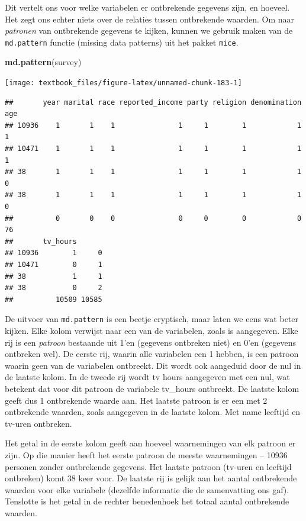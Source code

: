 \documentclass[]{tufte-book}
\newenvironment{Shaded}{}{}
\newcommand{\KeywordTok}[1]{\textcolor[rgb]{0.00,0.44,0.13}{\textbf{#1}}}
\newcommand{\NormalTok}[1]{#1}
\begin{document}
Dit vertelt ons voor welke variabelen er ontbrekende gegevens zijn, en hoeveel. Het zegt ons echter niets over de relaties tussen ontbrekende waarden. Om naar \emph{patronen} van ontbrekende gegevens te kijken, kunnen we gebruik maken van de \texttt{md.pattern} functie (missing data patterns) uit het pakket \texttt{mice}.

\begin{Shaded}
\begin{Highlighting}[]
\KeywordTok{md.pattern}\NormalTok{(survey)}
\end{Highlighting}
\end{Shaded}

\texttt{[image: textbook\_files/figure-latex/unnamed-chunk-183-1]}

\begin{verbatim}
##       year marital race reported_income party religion denomination age
## 10936    1       1    1               1     1        1            1   1
## 10471    1       1    1               1     1        1            1   1
## 38       1       1    1               1     1        1            1   0
## 38       1       1    1               1     1        1            1   0
##          0       0    0               0     0        0            0  76
##       tv_hours      
## 10936        1     0
## 10471        0     1
## 38           1     1
## 38           0     2
##          10509 10585
\end{verbatim}

De uitvoer van \texttt{md.pattern} is een beetje cryptisch, maar laten we eens wat beter kijken. Elke kolom verwijst naar een van de variabelen, zoals is aangegeven. Elke rij is een \emph{patroon} bestaande uit 1'en (gegevens ontbreken niet) en 0'en (gegevens ontbreken wel). De eerste rij, waarin alle variabelen een 1 hebben, is een patroon waarin geen van de variabelen ontbreekt. Dit wordt ook aangeduid door de nul in de laatste kolom. In de tweede rij wordt tv hours aangegeven met een nul, wat betekent dat voor dit patroon de variabele tv\_hours ontbreekt. De laatste kolom geeft dus 1 ontbrekende waarde aan. Het laatste patroon is er een met 2 ontbrekende waarden, zoals aangegeven in de laatste kolom. Met name leeftijd en tv-uren ontbreken.

Het getal in de eerste kolom geeft aan hoeveel waarnemingen van elk patroon er zijn. Op die manier heeft het eerste patroon de meeste waarnemingen -- 10936 personen zonder ontbrekende gegevens. Het laatste patroon (tv-uren en leeftijd ontbreken) komt 38 keer voor. De laatste rij is gelijk aan het aantal ontbrekende waarden voor elke variabele (dezelfde informatie die de samenvatting ons gaf). Tenslotte is het getal in de rechter benedenhoek het totaal aantal ontbrekende waarden.
\end{document}
